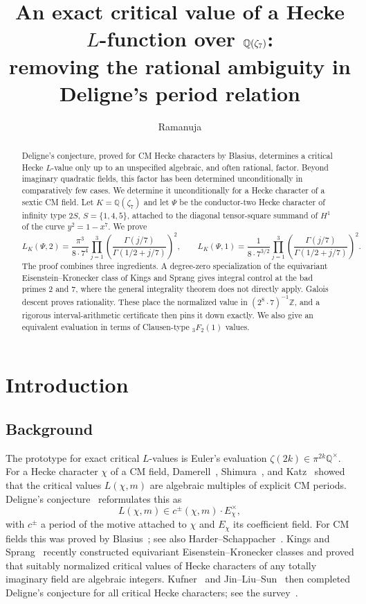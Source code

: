 \documentclass[11pt]{amsart}
\title[An exact critical value for a septic CM Hecke character]{An exact critical value of a Hecke $L$-function over $\Q(\zeta_7)$:\\ removing the rational ambiguity in Deligne's period relation}
\author{Ramanuja}
\theoremstyle{remark}
\theoremstyle{definition}
\newcommand{\Q}{\mathbb{Q}}
\newcommand{\Z}{\mathbb{Z}}
\begin{document}
\begin{abstract}
Deligne's conjecture, proved for CM Hecke characters by Blasius, determines a critical Hecke $L$-value only up to an unspecified algebraic, and often rational, factor. Beyond imaginary quadratic fields, this factor has been determined unconditionally in comparatively few cases. We determine it unconditionally for a Hecke character of a sextic CM field. Let $K=\Q(\zeta_7)$ and let $\Psi$ be the conductor-two Hecke character of infinity type $2S$, $S=\{1,4,5\}$, attached to the diagonal tensor-square summand of $H^1$ of the curve $y^2=1-x^7$. We prove
\[
L_K(\Psi,2)=\frac{\pi^3}{8\cdot 7^4}\prod_{j=1}^{3}\left(\frac{\Gamma(j/7)}{\Gamma(1/2+j/7)}\right)^{2},
\qquad
L_K(\Psi,1)=\frac{1}{8\cdot 7^{3/2}}\prod_{j=1}^{3}\left(\frac{\Gamma(j/7)}{\Gamma(1/2+j/7)}\right)^{2}.
\]
The proof combines three ingredients. A degree-zero specialization of the equivariant Eisenstein--Kronecker class of Kings and Sprang gives integral control at the bad primes $2$ and $7$, where the general integrality theorem does not directly apply. Galois descent proves rationality. These place the normalized value in $(2^8\cdot 7)^{-1}\Z$, and a rigorous interval-arithmetic certificate then pins it down exactly. We also give an equivalent evaluation in terms of Clausen-type ${}_3F_2(1)$ values.
\end{abstract}

\maketitle

\section{Introduction}

\subsection{Background}
The prototype for exact critical $L$-values is Euler's evaluation $\zeta(2k)\in\pi^{2k}\Q^\times$. For a Hecke character $\chi$ of a CM field, Damerell~\cite{Damerell}, Shimura~\cite{ShimuraCM}, and Katz~\cite{Katz} showed that the critical values $L(\chi,m)$ are algebraic multiples of explicit CM periods. Deligne's conjecture~\cite{Deligne} reformulates this as
\[
L(\chi,m)\in c^{\pm}(\chi,m)\cdot E_\chi^{\times},
\]
with $c^\pm$ a period of the motive attached to $\chi$ and $E_\chi$ its coefficient field. For CM fields this was proved by Blasius~\cite{Blasius}; see also Harder--Schappacher~\cite{HarderSchappacher}. Kings and Sprang~\cite{KS} recently constructed equivariant Eisenstein--Kronecker classes and proved that suitably normalized critical values of Hecke characters of any totally imaginary field are algebraic integers. Kufner~\cite{Kufner} and Jin--Liu--Sun~\cite{JLS} then completed Deligne's conjecture for all critical Hecke characters; see the survey~\cite{KSsurvey}.
\end{document}
